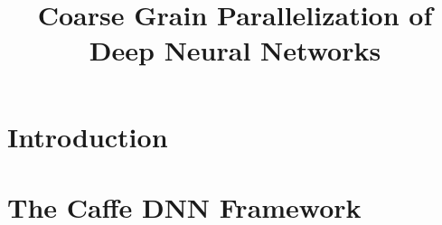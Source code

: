 \documentclass[preprint,nocopyrightspace]{sigplanconf}
\begin{document}
\setlength{\pdfpageheight}{\paperheight}
\setlength{\pdfpagewidth}{\paperwidth}






\title{Coarse Grain Parallelization of Deep Neural Networks}

           {}
           {}

\maketitle

\begin{abstract}

\end{abstract}




\newcommand{\todo}[1]{}
\renewcommand{\todo}[1]{{\color{red} TODO: {#1}}}

\section{Introduction}
 

\section{The Caffe DNN Framework}
\label{sec-caffe}
 
\end{document}
